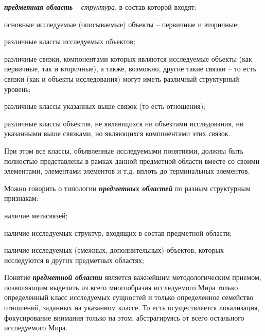 \begin{SCn}
{\textbf{\textit{предметная область}} -- \textit{структура}, в состав которой входят:
\begin{scnitemize}
\item \textnormal{основные исследуемые (описываемые) объекты -- первичные и вторичные;}
\item \textnormal{различные классы исследуемых объектов;}
\item \textnormal{различные связки, компонентами которых являются исследуемые объекты (как первичные, так и вторичные), а также, возможно, другие такие связки -- то есть связки (как и объекты исследования) могут иметь различный структурный уровень;}
\item \textnormal{различные классы указанных выше связок (то есть отношения);}
\item \textnormal{различные классы объектов, не являющихся ни объектами исследования, ни указанными выше связками, но являющихся компонентами этих связок.}
\end{scnitemize}


При этом все классы, объявленные исследуемыми понятиями, должны быть полностью представлены в рамках данной предметной области вместе со своими элементами, элементами элементов и т.д. вплоть до терминальных элементов.


Можно говорить о типологии \textbf{\textit{предметных областей}} по разным структурным признакам:
\begin{scnitemize}
    \item наличие метасвязей;
    \item наличие исследуемых структур, входящих в состав предметной области;
    \item наличие исследуемых (смежных, дополнительных) объектов, которых исследуются в других предметных областях;
\end{scnitemize}


Понятие \textbf{\textit{предметной области}} является важнейшим методологическим приемом, позволяющим выделить из всего многообразия исследуемого Мира только определенный класс исследуемых сущностей и только определенное семейство отношений, заданных на указанном классе. То есть осуществляется локализация, фокусирование внимания только на этом, абстрагируясь от всего остального исследуемого Мира.


}
\end{SCn}
